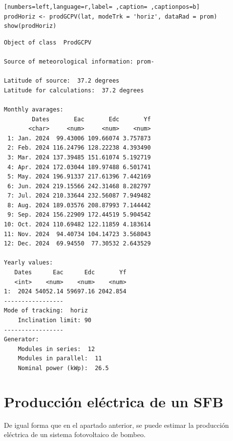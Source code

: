 \begin{lstlisting}[numbers=left,language=r,label= ,caption= ,captionpos=b]
prodHoriz <- prodGCPV(lat, modeTrk = 'horiz', dataRad = prom)
show(prodHoriz)
\end{lstlisting}

\begin{verbatim}
Object of class  ProdGCPV 

Source of meteorological information: prom- 

Latitude of source:  37.2 degrees
Latitude for calculations:  37.2 degrees

Monthly avarages:
        Dates       Eac       Edc       Yf
       <char>     <num>     <num>    <num>
 1: Jan. 2024  99.43006 109.66074 3.757873
 2: Feb. 2024 116.24796 128.22238 4.393490
 3: Mar. 2024 137.39485 151.61074 5.192719
 4: Apr. 2024 172.03044 189.97488 6.501741
 5: May. 2024 196.91337 217.61396 7.442169
 6: Jun. 2024 219.15566 242.31468 8.282797
 7: Jul. 2024 210.33644 232.56087 7.949482
 8: Aug. 2024 189.03576 208.87993 7.144442
 9: Sep. 2024 156.22909 172.44519 5.904542
10: Oct. 2024 110.69482 122.11859 4.183614
11: Nov. 2024  94.40734 104.14723 3.568043
12: Dec. 2024  69.94550  77.30532 2.643529

Yearly values:
   Dates      Eac      Edc       Yf
   <int>    <num>    <num>    <num>
1:  2024 54052.14 59697.16 2042.854
-----------------
Mode of tracking:  horiz 
    Inclination limit: 90 
-----------------
Generator:
    Modules in series:  12 
    Modules in parallel:  11 
    Nominal power (kWp):  26.5
\end{verbatim}

\section{Producción eléctrica de un SFB}
\label{sec:orge0731f1}
De igual forma que en el apartado anterior, se puede estimar la producción eléctrica de un sistema fotovoltaico de bombeo.


